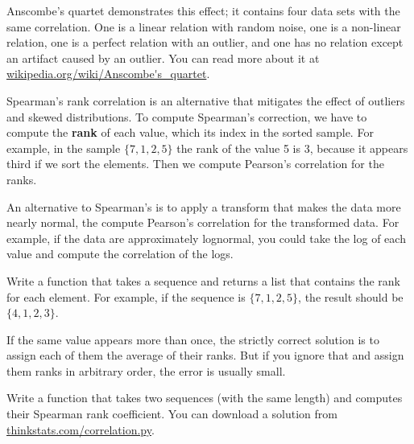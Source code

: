 \documentclass[12pt]{book}
\begin{document}


Anscombe's quartet demonstrates this effect; it contains four data
sets with the same correlation.  One is a linear relation with random
noise, one is a non-linear relation, one is a perfect relation with an
outlier, and one has no relation except an artifact caused by an
outlier.  You can read more about it at
\url{wikipedia.org/wiki/Anscombe's_quartet}.


Spearman's rank correlation is an alternative that mitigates the
effect of outliers and skewed distributions.  To compute Spearman's
correction, we have to compute the {\bf rank} of each value, which its
index in the sorted sample.  For example, in the sample $\{ 7, 1, 2, 5
\}$ the rank of the value 5 is 3, because it appears third if we sort
the elements.  Then we compute Pearson's correlation for the ranks.

An alternative to Spearman's is to apply a transform that makes the
data more nearly normal, the compute Pearson's correlation for the
transformed data.  For example, if the data are approximately
lognormal, you could take the log of each value and compute the
correlation of the logs.


\begin{ex}

Write a function that takes a sequence and returns a list that
contains the rank for each element.  For example, if the sequence is
$\{ 7, 1, 2, 5 \}$, the result should be $\{ 4, 1, 2, 3 \}$.

If the same value appears more than once, the strictly correct
solution is to assign each of them the average of their ranks.  But if
you ignore that and assign them ranks in arbitrary order, the error is
usually small.

Write a function that takes two sequences (with the same length) and
computes their Spearman rank coefficient.  You can download a solution
from \url{thinkstats.com/correlation.py}.



\end{ex}
\end{document}
